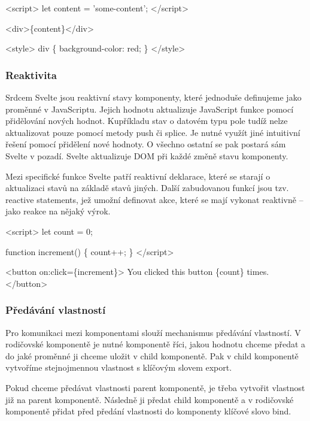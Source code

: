\begin{prog}
<script>
  let content = 'some-content';
</script>

<div>\{content\}</div>
  
<style>
  div \{
    background-color: red;
  \}
</style>
\end{prog}

\subsubsection{Reaktivita}

Srdcem Svelte jsou reaktivní stavy komponenty, které jednoduše definujeme jako proměnné v JavaScriptu. Jejich hodnotu aktualizuje JavaScript funkce pomocí přidělování nových hodnot. 
Kupříkladu stav o datovém typu pole tudíž nelze aktualizovat pouze pomocí metody push či splice. Je nutné využít jiné intuitivní řešení pomocí přidělení nové hodnoty.
O všechno ostatní se pak postará sám Svelte v pozadí. Svelte aktualizuje DOM při každé změně stavu komponenty. 

Mezi specifické funkce Svelte patří reaktivní deklarace, které se starají o aktualizaci stavů na základě stavů jiných. 
Další zabudovanou funkcí jsou tzv. reactive statements, jež umožní definovat akce, které se mají vykonat reaktivně -- jako reakce na nějaký výrok.\cite{sveltehandbook,svelte}

\begin{prog}
<script>
  let count = 0;

  function increment() \{
    count++;
  \}
</script>

<button on:click=\{increment\}>
  You clicked this button \{count\} times.
</button>
\end{prog}

\subsubsection{Předávání vlastností}

Pro komunikaci mezi komponentami slouží mechanismus předávání vlastností. 
V rodičovské komponentě je nutné komponentě říci, jakou hodnotu chceme předat a do jaké proměnné ji chceme uložit v child komponentě. 
Pak v child komponentě vytvoříme stejnojmennou vlastnost s klíčovým slovem export.

Pokud chceme předávat vlastnosti parent komponentě, je třeba vytvořit vlastnost již na parent komponentě. 
Následně ji předat child komponentě a v rodičovské komponentě přidat před předání vlastnosti do komponenty klíčové slovo bind.\cite{svelte}

